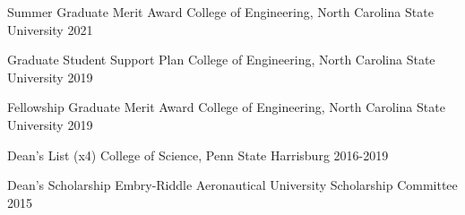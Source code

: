 \begin{cvhonors}
  \cvhonor
    {Summer Graduate Merit Award} %
    {College of Engineering, North Carolina State University} %
    {}
    {2021} %

  \cvhonor
    {Graduate Student Support Plan} %
    {College of Engineering, North Carolina State University} %
    {}
    {2019} %

  \cvhonor
    {Fellowship Graduate Merit Award} %
    {College of Engineering, North Carolina State University} %
    {}
    {2019} %

  \cvhonor
    {Dean's List (x4)} %
    {College of Science, Penn State Harrisburg} %
    {} %
    {2016-2019} %

  \cvhonor
    {Dean's Scholarship} %
    {Embry-Riddle Aeronautical University Scholarship Committee} %
    {}
    {2015} %

\end{cvhonors}